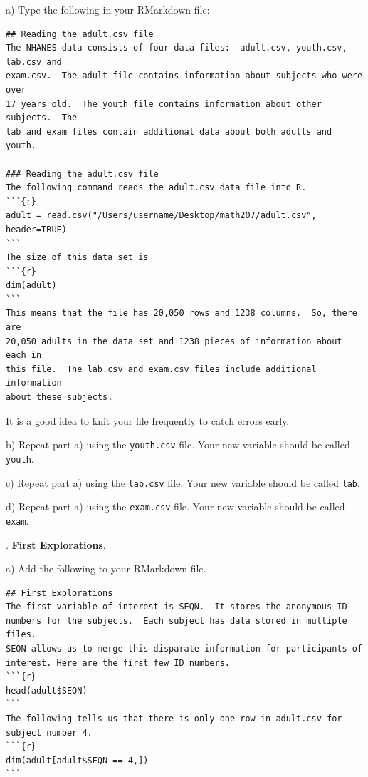\documentclass[10pt]{article}
\newcounter{EX}\setcounter{EX}{1}
\newcommand{\EXERCISE}{\arabic{EX}.\stepcounter{EX} }
\begin{document}
\hspace{10pt} a) Type the following in your RMarkdown file:\vspace{-6pt}
\begin{verbatim}
## Reading the adult.csv file
The NHANES data consists of four data files:  adult.csv, youth.csv, lab.csv and 
exam.csv.  The adult file contains information about subjects who were over
17 years old.  The youth file contains information about other subjects.  The
lab and exam files contain additional data about both adults and youth.

### Reading the adult.csv file
The following command reads the adult.csv data file into R.
```{r}
adult = read.csv("/Users/username/Desktop/math207/adult.csv", header=TRUE)
```
The size of this data set is
```{r}
dim(adult)
```
This means that the file has 20,050 rows and 1238 columns.  So, there are
20,050 adults in the data set and 1238 pieces of information about each in 
this file.  The lab.csv and exam.csv files include additional information
about these subjects.
\end{verbatim}\vspace{-6pt}

It is a good idea to knit your file frequently to catch errors early.
\smallskip

\hspace{10pt} b) Repeat part a) using the \texttt{youth.csv} file.
Your new variable should be called \texttt{youth}.

\hspace{10pt} c) Repeat part a) using the \texttt{lab.csv} file.
Your new variable should be called \texttt{lab}.

\hspace{10pt} d) Repeat part a) using the \texttt{exam.csv} file.
Your new variable should be called \texttt{exam}.
\vfill
\eject

\EXERCISE \textbf{First Explorations}. 

\hspace{10pt} a) Add the following to your RMarkdown file.\vspace{-6pt}

\begin{verbatim}
## First Explorations
The first variable of interest is SEQN.  It stores the anonymous ID
numbers for the subjects.  Each subject has data stored in multiple files.
SEQN allows us to merge this disparate information for participants of
interest. Here are the first few ID numbers.
```{r}
head(adult$SEQN)
```
The following tells us that there is only one row in adult.csv for 
subject number 4.
```{r}
dim(adult[adult$SEQN == 4,])
```
\end{verbatim}
\end{document}

